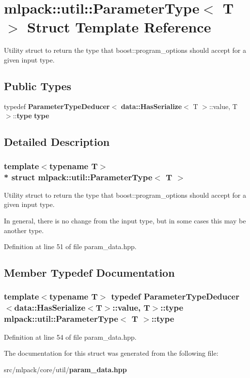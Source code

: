 \section{mlpack\+:\+:util\+:\+:Parameter\+Type$<$ T $>$ Struct Template Reference}
\label{structmlpack_1_1util_1_1ParameterType}


Utility struct to return the type that boost\+::program\+\_\+options should accept for a given input type.  


\subsection*{Public Types}
\begin{DoxyCompactItemize}
\item 
typedef {\bf Parameter\+Type\+Deducer}$<$ {\bf data\+::\+Has\+Serialize}$<$ T $>$\+::value, T $>$\+::{\bf type} {\bf type}
\end{DoxyCompactItemize}


\subsection{Detailed Description}
\subsubsection*{template$<$typename T$>$\\*
struct mlpack\+::util\+::\+Parameter\+Type$<$ T $>$}

Utility struct to return the type that boost\+::program\+\_\+options should accept for a given input type. 

In general, there is no change from the input type, but in some cases this may be another type. 

Definition at line 51 of file param\+\_\+data.\+hpp.



\subsection{Member Typedef Documentation}
\subsubsection[{type}]{\setlength{\rightskip}{0pt plus 5cm}template$<$typename T$>$ typedef {\bf Parameter\+Type\+Deducer}$<${\bf data\+::\+Has\+Serialize}$<$T$>$\+::value, T$>$\+::{\bf type} {\bf mlpack\+::util\+::\+Parameter\+Type}$<$ T $>$\+::{\bf type}}\label{structmlpack_1_1util_1_1ParameterType_a53dc6f6798b56aecaf64bb1f616ddecb}


Definition at line 54 of file param\+\_\+data.\+hpp.



The documentation for this struct was generated from the following file\+:\begin{DoxyCompactItemize}
\item 
src/mlpack/core/util/{\bf param\+\_\+data.\+hpp}\end{DoxyCompactItemize}
